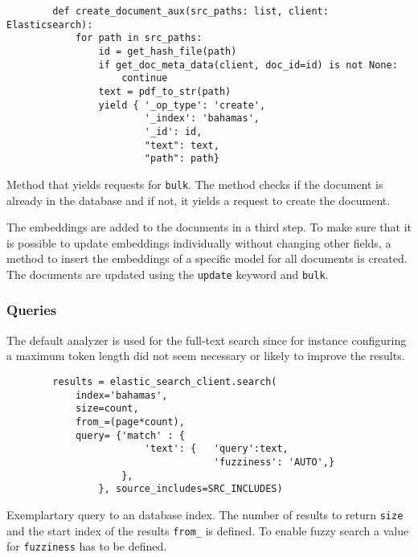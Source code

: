 \begin{listing}[htp]
    \begin{verbatim}
        def create_document_aux(src_paths: list, client: Elasticsearch):  
            for path in src_paths:           
                id = get_hash_file(path)
                if get_doc_meta_data(client, doc_id=id) is not None:
                    continue
                text = pdf_to_str(path)
                yield { '_op_type': 'create',
                        '_index': 'bahamas',
                        '_id': id,
                        "text": text,
                        "path": path}
    \end{verbatim}
    \caption{Method that yields requests for \texttt{bulk}.
    The method checks if the document is already in the database and if not, it yields a request to create the document.
    }
    \label{lst:db_bulk_yield}
\end{listing}

The embeddings are added to the documents in a third step.
To make sure that it is possible to update embeddings individually without changing other fields, 
a method to insert the embeddings of a specific model for all documents is created.
The documents are updated using the \texttt{update} keyword and \texttt{bulk}.


\subsubsection*{Queries}
The default analyzer is used for the full-text search since for instance configuring a maximum token length did not seem necessary or likely to improve the results.

\begin{listing}[htp]
    \begin{verbatim}
        results = elastic_search_client.search(
            index='bahamas', 
            size=count,
            from_=(page*count),
            query= {'match' : {
                        'text': {   'query':text,
                                    'fuzziness': 'AUTO',}
                    }, 
                }, source_includes=SRC_INCLUDES)
    \end{verbatim}
    \caption{Exemplartary query to an \databaseName database index.
    The number of results to return \texttt{size} and the start index of the results \texttt{from\_} is defined.
    To enable fuzzy search a value for \texttt{fuzziness} has to be defined. 
    }
    \label{lst:fuzzy_query}
\end{listing}

